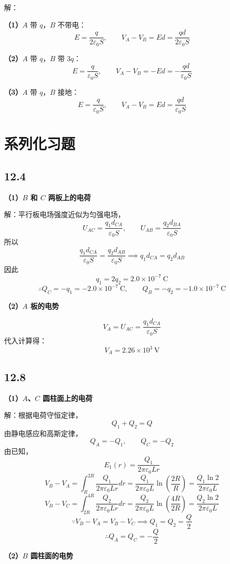\documentclass[UTF8,a4paper,12pt]{ctexart}
\begin{document}
解：

\textbf{（1）}$A$ 带 $q$，$B$ 不带电：
\[
E=\frac{q}{2\varepsilon_0S},
\qquad
V_A-V_B=Ed=\frac{qd}{2\varepsilon_0S}
\]

\textbf{（2）}$A$ 带 $q$，$B$ 带 $3q$：
\[
E=\frac{q}{\varepsilon_0S},
\qquad
V_A-V_B=-Ed=-\frac{qd}{\varepsilon_0S}
\]

\textbf{（3）}$A$ 带 $q$，$B$ 接地：
\[
E=\frac{q}{\varepsilon_0S},
\qquad
V_A-V_B=Ed=\frac{qd}{\varepsilon_0S}
\]

\section*{系列化习题}

\subsection*{12.4}

\textbf{（1）$B$ 和 $C$ 两板上的电荷}

解：平行板电场强度近似为匀强电场，
\[
U_{AC}=\frac{q_1d_{CA}}{\varepsilon_0S},
\qquad
U_{AB}=\frac{q_2d_{BA}}{\varepsilon_0S}
\]
所以
\[
\frac{q_1d_{CA}}{\varepsilon_0S}
=
\frac{q_2d_{AB}}{\varepsilon_0S}
\implies
q_1d_{CA}=q_2d_{AB}
\]
因此
\[
q_1=2q_2=2.0\times10^{-7}\ \mathrm{C}
\]
\[
\therefore Q_C=-q_1=-2.0\times10^{-7}\ \mathrm{C},
\qquad
Q_B=-q_2=-1.0\times10^{-7}\ \mathrm{C}
\]

\textbf{（2）$A$ 板的电势}

\[
V_A=U_{AC}=\frac{q_1d_{CA}}{\varepsilon_0S}
\]
代入计算得：
\[
V_A=2.26\times10^3\ \mathrm{V}
\]

\subsection*{12.8}

\textbf{（1）$A$、$C$ 圆柱面上的电荷}

解：根据电荷守恒定律，
\[
Q_1+Q_2=Q
\]
由静电感应和高斯定律，
\[
Q_A=-Q_1,\qquad Q_C=-Q_2
\]
由已知，
\[
E_1(r)=\frac{Q_1}{2\pi\varepsilon_0Lr}
\]
\[
V_B-V_A
=
\int_R^{2R}\frac{Q_1}{2\pi\varepsilon_0Lr}dr
=
\frac{Q_1}{2\pi\varepsilon_0L}\ln\left(\frac{2R}{R}\right)
=
\frac{Q_1\ln 2}{2\pi\varepsilon_0L}
\]
\[
V_B-V_C
=
\int_{2R}^{4R}\frac{Q_2}{2\pi\varepsilon_0Lr}dr
=
\frac{Q_2}{2\pi\varepsilon_0L}\ln\left(\frac{4R}{2R}\right)
=
\frac{Q_2\ln 2}{2\pi\varepsilon_0L}
\]
\[
\because V_B-V_A=V_B-V_C
\implies
Q_1=Q_2=\frac{Q}{2}
\]
\[
\therefore Q_A=Q_C=-\frac{Q}{2}
\]

\textbf{（2）$B$ 圆柱面的电势}
\end{document}
